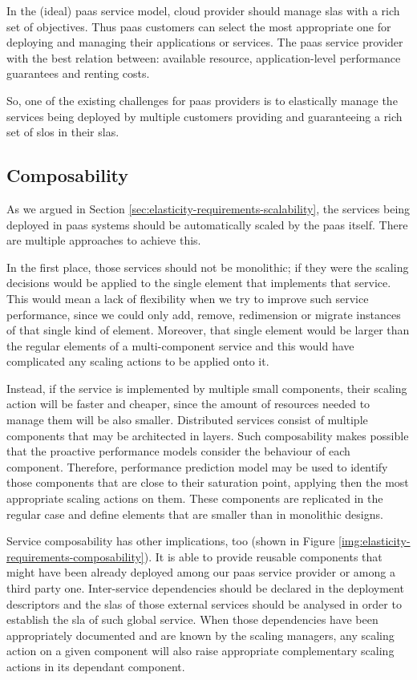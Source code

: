 In the (ideal) \ac{paas} service model, cloud provider should manage \ac{sla}s with a rich set of objectives.
Thus \ac{paas} customers can select the most appropriate one for deploying and managing their applications
or services. The \ac{paas} service provider with the best relation between: available resource,
application-level performance guarantees and renting costs.

So, one of the existing challenges for \ac{paas} providers is to elastically manage the services being
deployed by multiple customers providing and guaranteeing a rich set of \ac{slo}s in their \ac{sla}s.

\subsection*{Composability}
\label{sec:elasticity-requirements-composability}
As we argued in Section \ref{sec:elasticity-requirements-scalability}, the services being deployed in
\ac{paas} systems should be automatically scaled by the \ac{paas} itself. There are multiple approaches
to achieve this.

In the first place, those services should not be monolithic; if they were the scaling decisions would
be applied to the single element that implements that service. This would mean a lack of flexibility
when we try to improve such service performance, since we could only add, remove, redimension or migrate
instances of that single kind of element. Moreover, that single element would be larger than the regular
elements of a multi-component service and this would have complicated any scaling actions to be applied
onto it.

Instead, if the service is implemented by multiple small components, their scaling action will be faster
and cheaper, since the amount of resources needed to manage them will be also smaller.
Distributed services consist of multiple components that may be architected in layers. Such composability
makes possible that the proactive performance models consider the behaviour of each component. Therefore,
performance prediction model may be used to identify those components that are close to their saturation
point, applying then the most appropriate scaling actions on them. These components are replicated in
the regular case and define elements that are smaller than in monolithic designs.

Service composability has other implications, too (shown in Figure \ref{img:elasticity-requirements-composability}).
It is able to provide reusable components that might have been already deployed among our \ac{paas} service provider
or among a third party one. Inter-service dependencies should be declared in the deployment descriptors and the
\ac{sla}s of those external services should be analysed in order to establish the \ac{sla} of such global service.
When those dependencies have been appropriately documented and are known by the scaling managers, any scaling
action on a given component will also raise appropriate complementary scaling actions in its dependant
component.

